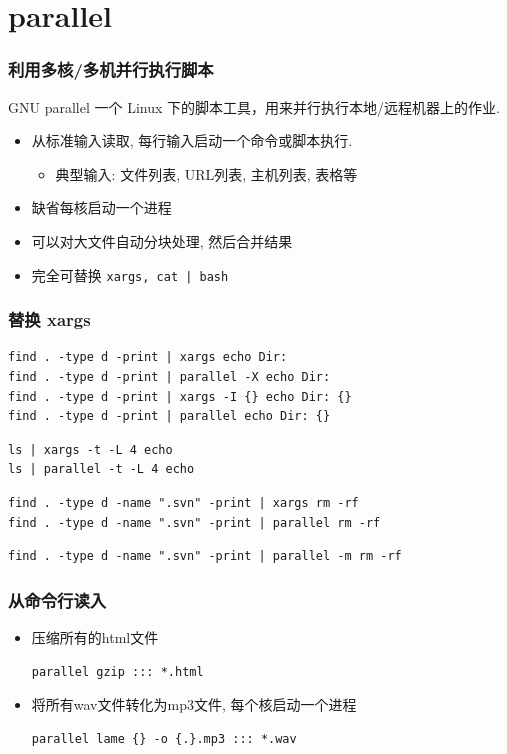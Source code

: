 \documentclass[compress]{beamer}
\begin{document}
\section{parallel}

\begin{frame}[fragile]
    \frametitle{利用多核/多机并行执行脚本}
\begin{block}{GNU parallel}
一个 Linux 下的脚本工具，用来并行执行本地/远程机器上的作业.
\begin{itemize}
    \item 从标准输入读取, 每行输入启动一个命令或脚本执行. 
    \begin{itemize}
    \item 典型输入: 文件列表,  URL列表, 主机列表, 表格等
    \end{itemize}
    \item 缺省每核启动一个进程
    \item 可以对大文件自动分块处理, 然后合并结果
    \item 完全可替换 \verb~xargs, cat | bash~
\end{itemize}
\end{block}
\end{frame}


\begin{frame}[fragile]
    \frametitle{替换 xargs}
\begin{Verbatim}
find . -type d -print | xargs echo Dir:
find . -type d -print | parallel -X echo Dir:
find . -type d -print | xargs -I {} echo Dir: {}
find . -type d -print | parallel echo Dir: {}
\end{Verbatim}
\pause
\begin{Verbatim}
ls | xargs -t -L 4 echo
ls | parallel -t -L 4 echo
\end{Verbatim}
\pause
\begin{Verbatim}
find . -type d -name ".svn" -print | xargs rm -rf
find . -type d -name ".svn" -print | parallel rm -rf
\end{Verbatim}
\pause
\begin{Verbatim}
find . -type d -name ".svn" -print | parallel -m rm -rf
\end{Verbatim}
\end{frame}

\begin{frame}[fragile]
    \frametitle{从命令行读入}
\begin{itemize}
\item <1->压缩所有的html文件 \\
\begin{Verbatim}
parallel gzip ::: *.html
\end{Verbatim}
\item <2->将所有wav文件转化为mp3文件, 每个核启动一个进程 \\
\begin{Verbatim}
parallel lame {} -o {.}.mp3 ::: *.wav
\end{Verbatim}
\end{itemize}
\end{frame}
\end{document}
